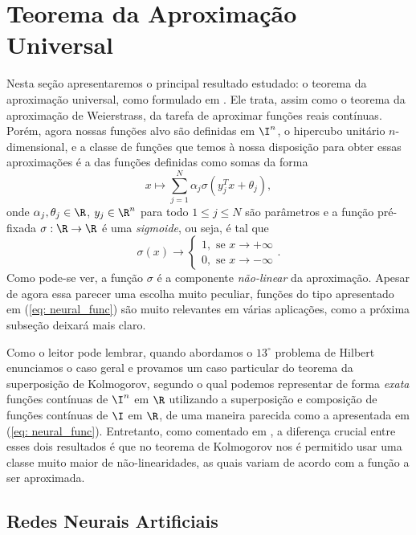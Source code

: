 
\section{Teorema da Aproximação Universal}

Nesta seção apresentaremos o principal resultado estudado: o teorema da aproximação universal, como formulado em \cite{cybenko89}.
Ele trata, assim como o teorema da aproximação de Weierstrass, da tarefa de aproximar funções reais contínuas.
Porém, agora nossas funções alvo são definidas em \( \I^{ n } \), o hipercubo unitário \( n \)-dimensional, e a classe de funções que temos à nossa disposição para obter essas aproximações é a das funções definidas como somas da forma
\begin{equation}
    x \mapsto \sum_{ j=1 }^{ N } \alpha_{ j } \sigma(y_{ j }^{ T }x + \theta_{ j })
    \label{eq: neural_func}
,\end{equation}
onde \( \alpha_{ j }, \theta_{ j } \in \R \), \( y_{ j } \in \R^{ n } \) para todo \( 1 \leq j \leq N \) são parâmetros e a função pré-fixada \( \sigma : \R \to \R \) é uma \emph{sigmoide}, ou seja, é tal que \[
    \sigma(x) \to
    \begin{cases}
        1, \text{ se } x \to +\infty \\
        0, \text{ se } x \to -\infty
    \end{cases}
.\]
Como pode-se ver, a função \( \sigma \) é a componente \emph{não-linear} da aproximação.
Apesar de agora essa parecer uma escolha muito peculiar, funções do tipo apresentado em (\ref{eq: neural_func}) são muito relevantes em várias aplicações, como a próxima subseção deixará mais claro.

Como o leitor pode lembrar, quando abordamos o \( 13^{ \circ } \) problema de Hilbert enunciamos o caso geral e provamos um caso particular do teorema da superposição de Kolmogorov, segundo o qual podemos representar de forma \emph{exata} funções contínuas de \( \I^{ n } \) em \( \R \) utilizando a superposição e composição de funções contínuas de \( \I \) em \( \R \), de uma maneira parecida como a apresentada em (\ref{eq: neural_func}).
Entretanto, como comentado em \cite{cybenko89}, a diferença crucial entre esses dois resultados é que no teorema de Kolmogorov nos é permitido usar uma classe muito maior de não-linearidades, as quais variam de acordo com a função a ser aproximada.

\subsection{Redes Neurais Artificiais}


